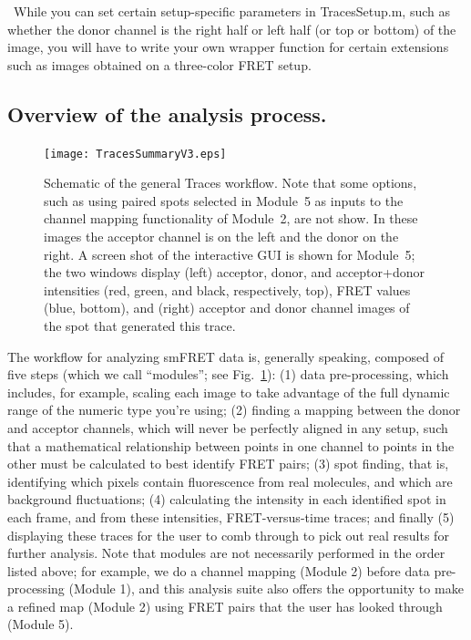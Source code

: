 \documentclass[11pt]{article}
\begin{document}
\noindent \textbullet~While you can set certain setup-specific parameters in TracesSetup.m, such as whether the donor channel is the right half or left half (or top or bottom) of the image, you will have to write your own wrapper function for certain extensions such as images obtained on a three-color FRET setup.

\subsection{Overview of the analysis process.}

\begin{figure}
\begin{center}
\texttt{[image: TracesSummaryV3.eps]}
\caption{Schematic of the general Traces workflow. Note that some options, such as using paired spots selected in Module~5 as inputs to the channel mapping functionality of Module~2, are not show. In these images the acceptor channel is on the left and the donor on the right. A screen shot of the interactive GUI is shown for Module~5; the two windows display (left) acceptor, donor, and acceptor+donor intensities (red, green, and black, respectively, top), FRET values (blue, bottom), and (right) acceptor and donor channel images of the spot that generated this trace.}
\label{fig:Workflow}
\end{center}
\end{figure}

The workflow for analyzing smFRET data is, generally speaking, composed of five steps (which we call ``modules''; see Fig.~\ref{fig:Workflow}): (1) data pre-processing, which includes, for example, scaling each image to take advantage of the full dynamic range of the numeric type you're using; (2) finding a mapping between the donor and acceptor channels, which will never be perfectly aligned in any setup, such that a mathematical relationship between points in one channel to points in the other must be calculated to best identify FRET pairs; (3) spot finding, that is, identifying which pixels contain fluorescence from real molecules, and which are background fluctuations; (4) calculating the intensity in each identified spot in each frame, and from these intensities, FRET-versus-time traces; and finally (5) displaying these traces for the user to comb through to pick out real results for further analysis.  Note that modules are not necessarily performed in the order listed above; for example, we do a channel mapping (Module 2) before data pre-processing (Module 1), and this analysis suite also offers the opportunity to make a refined map (Module 2) using FRET pairs that the user has looked through (Module 5).
\end{document}

